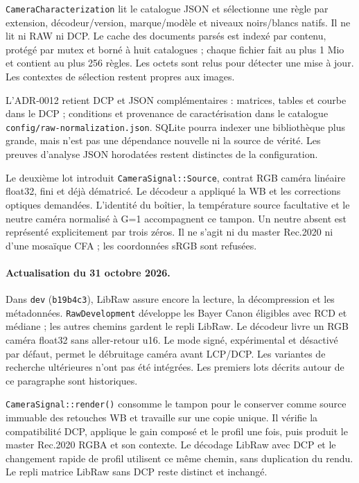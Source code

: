 \texttt{CameraCharacterization} lit le catalogue JSON et sélectionne une règle
par extension, décodeur/version, marque/modèle et niveaux noirs/blancs natifs.
Il ne lit ni RAW ni DCP. Le cache des documents parsés est indexé par contenu,
protégé par mutex et borné à huit catalogues ; chaque fichier fait au plus
1 Mio et contient au plus 256 règles. Les octets sont relus pour détecter une
mise à jour. Les contextes de sélection restent propres aux images.

L'ADR-0012 retient DCP et JSON complémentaires : matrices, tables et courbe
dans le DCP ; conditions et provenance de caractérisation dans le catalogue
\texttt{config/}\allowbreak\texttt{raw-normalization.json}. SQLite pourra indexer une bibliothèque
plus grande, mais n'est pas une dépendance nouvelle ni la source de vérité.
Les preuves d'analyse JSON horodatées restent distinctes de la configuration.

Le deuxième lot introduit \texttt{CameraSignal::Source}, contrat RGB caméra
linéaire float32, fini et déjà dématricé. Le décodeur a appliqué la WB et les
corrections optiques demandées. L'identité du boîtier, la température source
facultative et le neutre caméra normalisé à G=1 accompagnent ce tampon. Un
neutre absent est représenté explicitement par trois zéros. Il ne s'agit ni
du master Rec.2020 ni d'une mosaïque CFA ; les coordonnées sRGB sont refusées.

\paragraph{Actualisation du 31 octobre 2026.}
Dans \texttt{dev} (\texttt{b19b4c3}), LibRaw assure encore la lecture,
la décompression et les métadonnées. \texttt{RawDevelopment} développe les
Bayer Canon éligibles avec RCD et médiane ; les autres chemins gardent le repli
LibRaw. Le décodeur livre un RGB caméra float32 sans aller-retour u16.
Le mode signé, expérimental et désactivé par défaut, permet le débruitage
caméra avant LCP/DCP. Les variantes de recherche ultérieures n'ont pas été
intégrées. Les premiers lots décrits autour de ce paragraphe sont historiques.

\texttt{CameraSignal::render()} consomme le tampon pour le conserver comme
source immuable des retouches WB et travaille sur une copie unique. Il vérifie
la compatibilité DCP, applique le gain composé et le profil une fois, puis
produit le master Rec.2020 RGBA et son contexte. Le décodage LibRaw avec DCP
et le changement rapide de profil utilisent ce même chemin, sans duplication
du rendu. Le repli matrice LibRaw sans DCP reste distinct et inchangé.

